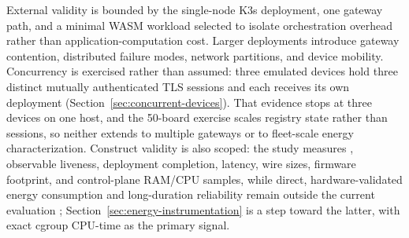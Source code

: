 {\color{red}External validity is bounded by the single-node K3s deployment, one gateway path, and a minimal WASM workload selected to isolate orchestration overhead rather than application-computation cost.} Larger deployments introduce gateway contention, distributed failure modes, network partitions, and device mobility. %
{\color{red}Concurrency is exercised rather than assumed: three emulated devices hold
three distinct mutually authenticated TLS sessions and each receives its own deployment
(Section~\ref{sec:concurrent-devices}). That evidence stops at three devices on one host,
and the 50-board exercise scales registry state rather than sessions, so neither extends to
multiple gateways or to fleet-scale energy characterization.} Construct validity is also scoped: the study measures %
, observable liveness, deployment completion, latency, wire sizes, firmware footprint, and control-plane RAM/CPU samples, while direct, hardware-validated energy consumption and long-duration reliability remain outside the current evaluation%
{\color{blue}; Section~\ref{sec:energy-instrumentation} is a step toward the latter, with exact cgroup CPU-time as the primary signal.}

